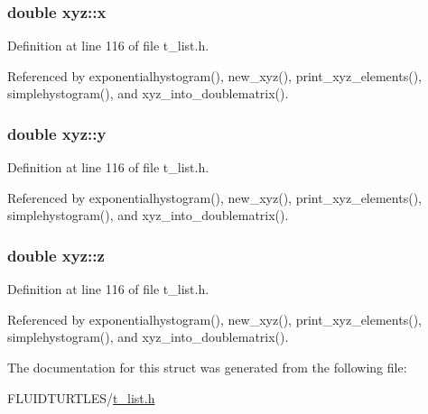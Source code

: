 \hypertarget{structxyz_a763cc12590d53e8ef7aacf1ffb3fa08d}{
\subsubsection[{x}]{\setlength{\rightskip}{0pt plus 5cm}double xyz\-::x}}\label{structxyz_a763cc12590d53e8ef7aacf1ffb3fa08d}


Definition at line 116 of file t\-\_\-list.\-h.



Referenced by exponentialhystogram(), new\-\_\-xyz(), print\-\_\-xyz\-\_\-elements(), simplehystogram(), and xyz\-\_\-into\-\_\-doublematrix().

\hypertarget{structxyz_abda377700c50373014a4bf7de0f3e25a}{
\subsubsection[{y}]{\setlength{\rightskip}{0pt plus 5cm}double xyz\-::y}}\label{structxyz_abda377700c50373014a4bf7de0f3e25a}


Definition at line 116 of file t\-\_\-list.\-h.



Referenced by exponentialhystogram(), new\-\_\-xyz(), print\-\_\-xyz\-\_\-elements(), simplehystogram(), and xyz\-\_\-into\-\_\-doublematrix().

\hypertarget{structxyz_a198550434ad05e30c85a63be7612883c}{
\subsubsection[{z}]{\setlength{\rightskip}{0pt plus 5cm}double xyz\-::z}}\label{structxyz_a198550434ad05e30c85a63be7612883c}


Definition at line 116 of file t\-\_\-list.\-h.



Referenced by exponentialhystogram(), new\-\_\-xyz(), print\-\_\-xyz\-\_\-elements(), simplehystogram(), and xyz\-\_\-into\-\_\-doublematrix().



The documentation for this struct was generated from the following file\-:\begin{DoxyCompactItemize}
\item 
F\-L\-U\-I\-D\-T\-U\-R\-T\-L\-E\-S/\hyperlink{t__list_8h}{t\-\_\-list.\-h}\end{DoxyCompactItemize}
